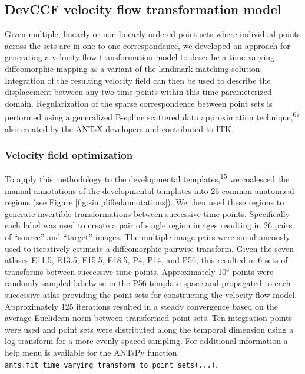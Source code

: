 \documentclass[
  12pt,
]{article}
\begin{document}
\hypertarget{devccf-velocity-flow-transformation-model}{%
\subsection{DevCCF velocity flow transformation
model}\label{devccf-velocity-flow-transformation-model}}

Given multiple, linearly or non-linearly ordered point sets where
individual points across the sets are in one-to-one correspondence, we
developed an approach for generating a velocity flow transformation
model to describe a time-varying diffeomorphic mapping as a variant of
the landmark matching solution. Integration of the resulting velocity
field can then be used to describe the displacement between any two time
points within this time-parameterized domain. Regularization of the
sparse correspondence between point sets is performed using a
generalized B-spline scattered data approximation
technique,\textsuperscript{67} also created by the ANTsX developers and
contributed to ITK.

\hypertarget{velocity-field-optimization}{%
\subsubsection{Velocity field
optimization}\label{velocity-field-optimization}}

To apply this methodology to the developmental
templates,\textsuperscript{15} we coalesced the manual annotations of
the developmental templates into 26 common anatomical regions (see
Figure \ref{fig:simplifiedannotations}). We then used these regions to
generate invertible transformations between successive time points.
Specifically each label was used to create a pair of single region
images resulting in 26 pairs of ``source'' and ``target'' images. The
multiple image pairs were simultaneously used to iteratively estimate a
diffeomorphic pairwise transform. Given the seven atlases E11.5, E13.5,
E15.5, E18.5, P4, P14, and P56, this resulted in 6 sets of transforms
between successive time points. Approximately 10\(^6\) points were
randomly sampled labelwise in the P56 template space and propagated to
each successive atlas providing the point sets for constructing the
velocity flow model. Approximately 125 iterations resulted in a steady
convergence based on the average Euclidean norm between transformed
point sets. Ten integration points were used and point sets were
distributed along the temporal dimension using a log transform for a
more evenly spaced sampling. For additional information a help menu is
available for the ANTsPy function
\texttt{ants.fit\_time\_varying\_transform\_to\_point\_sets(...)}.
\end{document}
